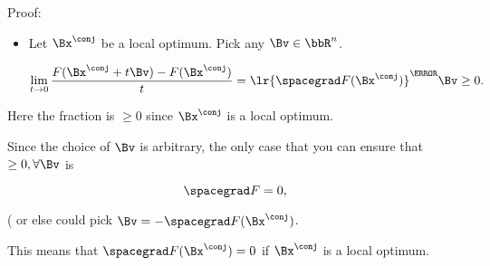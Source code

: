 
Proof:

\begin{itemize}
\item Let \( \Bx^\conj \) be a local optimum.  Pick any \( \Bv \in \bbR^n \).

\begin{equation}\label{eqn:convexOptimizationLecture7:720}
\lim_{t \rightarrow 0} \frac{ F(\Bx^\conj + t \Bv) - F(\Bx^\conj)}{t}
= \lr{ \spacegrad F(\Bx^\conj) }^\T \Bv
\ge 0.
\end{equation}
\end{itemize}

Here the fraction is \( \ge 0 \) since \( \Bx^\conj \) is a local optimum.

Since the choice of \( \Bv \) is arbitrary, the only case that you can ensure that \( \ge 0, \forall \Bv \) is

\begin{dmath}\label{eqn:convexOptimizationLecture7:740}
\spacegrad F = 0,
\end{dmath}

( or else could pick \( \Bv = -\spacegrad F(\Bx^\conj) \).

This means that \( \spacegrad F(\Bx^\conj) = 0 \) if \( \Bx^\conj \) is a local optimum.

